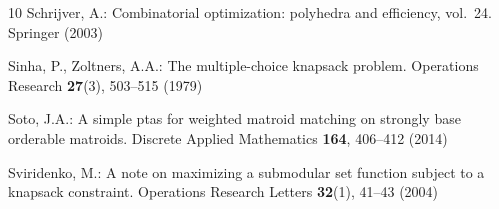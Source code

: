 \documentclass[11pt,letter]{article}
\begin{document}
\begin{thebibliography}{10}
Schrijver, A.: Combinatorial optimization: polyhedra and efficiency, vol.~24.
  Springer (2003)

Sinha, P., Zoltners, A.A.: The multiple-choice knapsack problem. Operations
  Research  \textbf{27}(3),  503--515 (1979)

Soto, J.A.: A simple ptas for weighted matroid matching on strongly base
  orderable matroids. Discrete Applied Mathematics  \textbf{164},  406--412
  (2014)

Sviridenko, M.: A note on maximizing a submodular set function subject to a
  knapsack constraint. Operations Research Letters  \textbf{32}(1),  41--43
  (2004)

\end{thebibliography}
		\appendix
		
\end{document}
